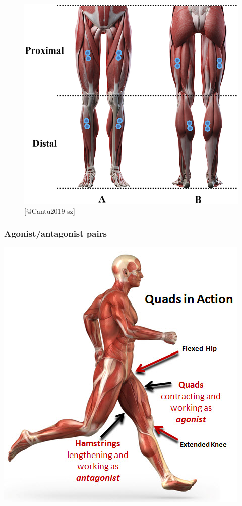 \documentclass[
  letterpaper,
  DIV=11,
  numbers=noendperiod]{scrartcl}
\begin{document}
\begin{figure}[H]

{\centering \includegraphics{action_files/mediabag/fneur-10-00951-g001.jpg}

}

\caption{{[}@Cantu2019-sz{]}}

\end{figure}%

\subsubsection{Agonist/antagonist pairs}\label{agonistantagonist-pairs}

\begin{center}
\includegraphics{action_files/mediabag/Hamstring-Quad4.jpg}
\end{center}
\end{document}
